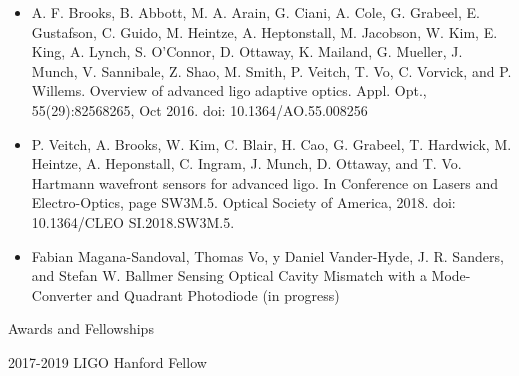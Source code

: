 \documentclass[suthesis,12pt,notitlepage]{report}
\begin{document}
\begin{itemize}
	\item{A. F. Brooks, B. Abbott, M. A. Arain, G. Ciani, A. Cole, G. Grabeel, E. Gustafson,
	C. Guido, M. Heintze, A. Heptonstall, M. Jacobson, W. Kim, E. King, A. Lynch,
	S. O’Connor, D. Ottaway, K. Mailand, G. Mueller, J. Munch, V. Sannibale, Z. Shao,
	M. Smith, P. Veitch, T. Vo, C. Vorvick, and P. Willems. Overview of advanced ligo
	adaptive optics. Appl. Opt., 55(29):8256{8265, Oct 2016. doi: 10.1364/AO.55.008256}}
	\item{P. Veitch, A. Brooks, W. Kim, C. Blair, H. Cao, G. Grabeel, T. Hardwick, M. Heintze,
	A. Heponstall, C. Ingram, J. Munch, D. Ottaway, and T. Vo. Hartmann wavefront
	sensors for advanced ligo. In Conference on Lasers and Electro-Optics, page SW3M.5.
	Optical Society of America, 2018. doi: 10.1364/CLEO SI.2018.SW3M.5.}
	\item{Fabian Magana-Sandoval, Thomas Vo, y Daniel Vander-Hyde, J. R. Sanders, and Stefan W. Ballmer Sensing Optical Cavity Mismatch with a Mode-Converter and Quadrant Photodiode (in progress)}
\end{itemize} 

\noindent Awards and Fellowships

2017-2019 LIGO Hanford Fellow

\finishvita
\end{document}
